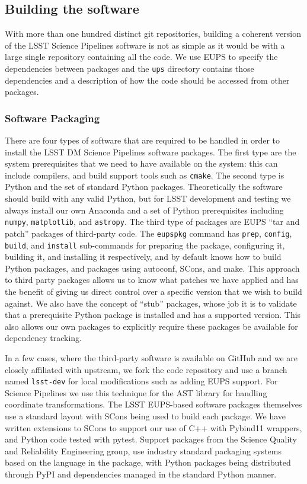 \subsection{Building the software}
\label{sec:buildsw}

With more than one hundred distinct git repositories, building a coherent version of the LSST Science Pipelines software is not as simple as it would be with a large single repository containing all the code.
We use EUPS to specify the dependencies between packages and the \texttt{ups} directory contains those dependencies and a description of how the code should be accessed from other packages.

\subsubsection{Software Packaging}

There are four types of software that are required to be handled in order to install the LSST DM Science Pipelines software packages.
The first type are the system prerequisites that we need to have available on the system: this can include compilers, and build support tools such as \texttt{cmake}.
The second type is Python and the set of standard Python packages.
Theoretically the software should  build with any valid Python, but for LSST development and testing we always install our own Anaconda and
 a set of Python prerequisites including \texttt{numpy}, \texttt{matplotlib}, and \texttt{astropy}\cite{2018arXiv180102634T}.
The third type of packages are EUPS ``tar and patch'' packages of third-party code.
The \texttt{eupspkg} command has \texttt{prep}, \texttt{config}, \texttt{build}, and \texttt{install} sub-commands for preparing the package, configuring it, building it, and installing it respectively, and by default knows how to build Python packages, and packages using autoconf, SCons, and make.
This approach to third party packages allows us to know what patches we have applied and has the benefit of giving us direct control over a specific version that we wish to build against.
We also have the concept of ``stub'' packages, whose job it is to validate that a prerequisite Python package is installed and has a supported version.
This also allows our own packages to explicitly require these packages be available for dependency tracking.

In a few cases, where the third-party software is available on GitHub and we are closely affiliated with upstream, we fork the code repository and use a branch named \texttt{lsst-dev} for local modifications such as adding EUPS support.
For Science Pipelines we use this technique for the AST library\cite{2016A&C....15...33B} for handling coordinate transformations.
The LSST EUPS-based software packages themselves use a standard layout with SCons\cite{2005Scons1377085} being used to build each package.
We have written extensions to SCons to support our use of C++ with Pybind11 wrappers, and Python code tested with pytest.
Support packages from the Science Quality and Reliability Engineering group, use industry standard packaging systems based on the language in the package, with Python packages being distributed through PyPI and dependencies managed in the standard Python manner.

